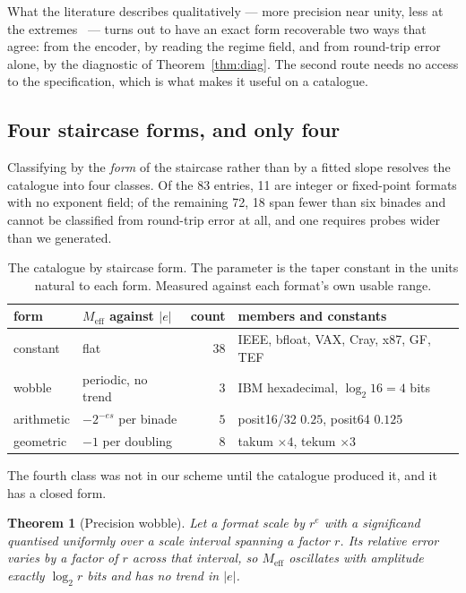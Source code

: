 \documentclass[11pt]{article}
\newtheorem{theorem}{Theorem}
\theoremstyle{definition}
\begin{document}
What the literature describes qualitatively --- more precision near unity, less
at the extremes~\cite{gustafson} --- turns out to have an exact form recoverable
two ways that agree: from the encoder, by reading the regime field, and from
round-trip error alone, by the diagnostic of Theorem~\ref{thm:diag}. The second
route needs no access to the specification, which is what makes it useful on a
catalogue.


\subsection{Four staircase forms, and only four}\label{sec:taxonomy}

Classifying by the \emph{form} of the staircase rather than by a fitted slope
resolves the catalogue into four classes. Of the 83 entries, 11 are integer or
fixed-point formats with no exponent field; of the remaining 72, 18 span fewer
than six binades and cannot be classified from round-trip error at all, and one
requires probes wider than we generated.

\begin{table}[t]\centering
\caption{The catalogue by staircase form. The parameter is the taper constant in
the units natural to each form. Measured against each format's own usable range.}
\label{tab:taxonomy}
\begin{tabular}{llrl}
\toprule
form & $M_{\mathrm{eff}}$ against $|e|$ & count & members and constants \\
\midrule
constant   & flat                          & $38$ & IEEE, bfloat, VAX, Cray, x87, GF, TEF \\
wobble     & periodic, no trend            & $3$  & IBM hexadecimal, $\log_2 16 = 4$ bits \\
arithmetic & $-2^{-es}$ per binade         & $5$  & posit16/32 $0.25$, posit64 $0.125$ \\
geometric  & $-1$ per doubling             & $8$  & takum $\times 4$, tekum $\times 3$ \\
\bottomrule
\end{tabular}
\end{table}

The fourth class was not in our scheme until the catalogue produced it, and it has
a closed form.

\begin{theorem}[Precision wobble]
\label{thm:wobble}
Let a format scale by $r^{e}$ with a significand quantised uniformly over a
scale interval spanning a factor $r$. Its relative error varies by a factor of
$r$ across that interval, so $M_{\mathrm{eff}}$ oscillates with amplitude exactly
$\log_2 r$ bits and has no trend in $|e|$.
\end{theorem}
\end{document}
